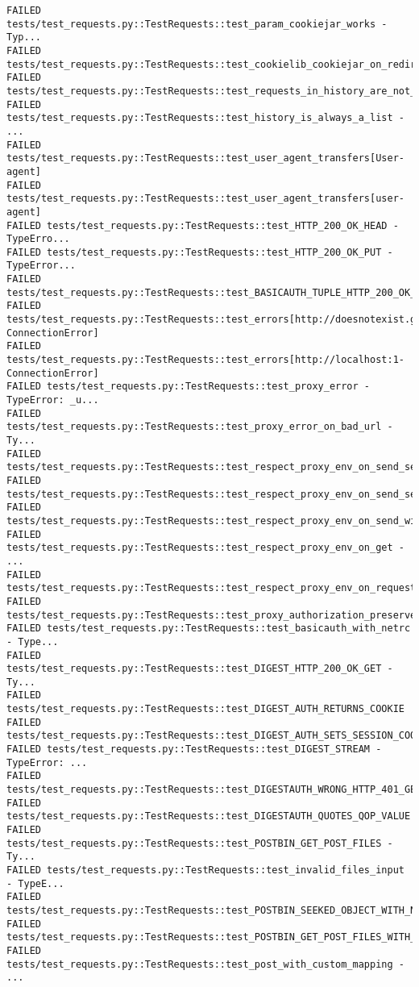 \begin{Verbatim}[fontsize=\small, breaklines=true, breakanywhere=true]
FAILED tests/test_requests.py::TestRequests::test_param_cookiejar_works - Typ...
FAILED tests/test_requests.py::TestRequests::test_cookielib_cookiejar_on_redirect
FAILED tests/test_requests.py::TestRequests::test_requests_in_history_are_not_overridden
FAILED tests/test_requests.py::TestRequests::test_history_is_always_a_list - ...
FAILED tests/test_requests.py::TestRequests::test_user_agent_transfers[User-agent]
FAILED tests/test_requests.py::TestRequests::test_user_agent_transfers[user-agent]
FAILED tests/test_requests.py::TestRequests::test_HTTP_200_OK_HEAD - TypeErro...
FAILED tests/test_requests.py::TestRequests::test_HTTP_200_OK_PUT - TypeError...
FAILED tests/test_requests.py::TestRequests::test_BASICAUTH_TUPLE_HTTP_200_OK_GET
FAILED tests/test_requests.py::TestRequests::test_errors[http://doesnotexist.google.com-ConnectionError]
FAILED tests/test_requests.py::TestRequests::test_errors[http://localhost:1-ConnectionError]
FAILED tests/test_requests.py::TestRequests::test_proxy_error - TypeError: _u...
FAILED tests/test_requests.py::TestRequests::test_proxy_error_on_bad_url - Ty...
FAILED tests/test_requests.py::TestRequests::test_respect_proxy_env_on_send_self_prepared_request
FAILED tests/test_requests.py::TestRequests::test_respect_proxy_env_on_send_session_prepared_request
FAILED tests/test_requests.py::TestRequests::test_respect_proxy_env_on_send_with_redirects
FAILED tests/test_requests.py::TestRequests::test_respect_proxy_env_on_get - ...
FAILED tests/test_requests.py::TestRequests::test_respect_proxy_env_on_request
FAILED tests/test_requests.py::TestRequests::test_proxy_authorization_preserved_on_request
FAILED tests/test_requests.py::TestRequests::test_basicauth_with_netrc - Type...
FAILED tests/test_requests.py::TestRequests::test_DIGEST_HTTP_200_OK_GET - Ty...
FAILED tests/test_requests.py::TestRequests::test_DIGEST_AUTH_RETURNS_COOKIE
FAILED tests/test_requests.py::TestRequests::test_DIGEST_AUTH_SETS_SESSION_COOKIES
FAILED tests/test_requests.py::TestRequests::test_DIGEST_STREAM - TypeError: ...
FAILED tests/test_requests.py::TestRequests::test_DIGESTAUTH_WRONG_HTTP_401_GET
FAILED tests/test_requests.py::TestRequests::test_DIGESTAUTH_QUOTES_QOP_VALUE
FAILED tests/test_requests.py::TestRequests::test_POSTBIN_GET_POST_FILES - Ty...
FAILED tests/test_requests.py::TestRequests::test_invalid_files_input - TypeE...
FAILED tests/test_requests.py::TestRequests::test_POSTBIN_SEEKED_OBJECT_WITH_NO_ITER
FAILED tests/test_requests.py::TestRequests::test_POSTBIN_GET_POST_FILES_WITH_DATA
FAILED tests/test_requests.py::TestRequests::test_post_with_custom_mapping - ...

\end{Verbatim}
